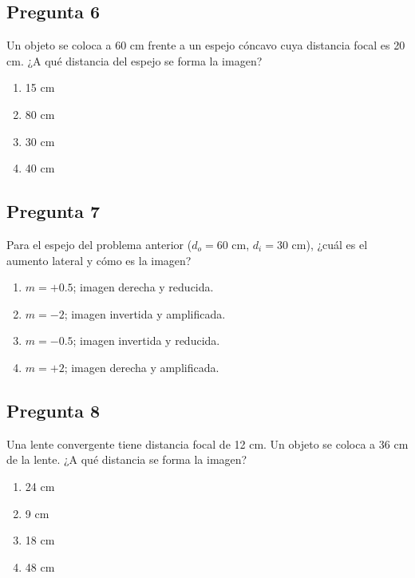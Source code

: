 \begin{preguntabox}
\subsection*{Pregunta 6}
Un objeto se coloca a 60 cm frente a un espejo cóncavo cuya distancia focal es 20 cm. ¿A qué distancia del espejo se forma la imagen?

\begin{enumerate}
    \item[A)] 15 cm
    \item[B)] 80 cm
    \item[C)] 30 cm
    \item[D)] 40 cm
\end{enumerate}
\end{preguntabox}

\begin{preguntabox}
\subsection*{Pregunta 7}
Para el espejo del problema anterior ($d_o = 60$ cm, $d_i = 30$ cm), ¿cuál es el aumento lateral y cómo es la imagen?

\begin{enumerate}
    \item[A)] $m = +0.5$; imagen derecha y reducida.
    \item[B)] $m = -2$; imagen invertida y amplificada.
    \item[C)] $m = -0.5$; imagen invertida y reducida.
    \item[D)] $m = +2$; imagen derecha y amplificada.
\end{enumerate}
\end{preguntabox}
\newpage
\begin{preguntabox}
\subsection*{Pregunta 8}
Una lente convergente tiene distancia focal de 12 cm. Un objeto se coloca a 36 cm de la lente. ¿A qué distancia se forma la imagen?

\begin{enumerate}
    \item[A)] 24 cm
    \item[B)] 9 cm
    \item[C)] 18 cm
    \item[D)] 48 cm
\end{enumerate}
\end{preguntabox}

